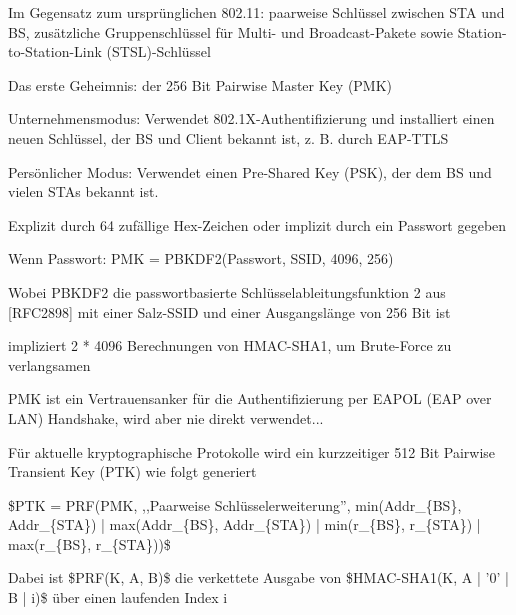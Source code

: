 \documentclass[a4paper]{article}
\begin{document}
\begin{multicols}{3}
      \begin{itemize*}
            \item Im Gegensatz zum ursprünglichen 802.11: paarweise Schlüssel zwischen
            STA und BS, zusätzliche Gruppenschlüssel für Multi- und
            Broadcast-Pakete sowie Station-to-Station-Link (STSL)-Schlüssel
            \item Das erste Geheimnis: der 256 Bit Pairwise Master Key (PMK)
            \begin{itemize*}
                  \item Unternehmensmodus: Verwendet 802.1X-Authentifizierung und installiert einen neuen Schlüssel, der BS und Client bekannt ist, z. B. durch EAP-TTLS
                  \item Persönlicher Modus: Verwendet einen Pre-Shared Key (PSK), der dem BS und vielen STAs bekannt ist.
                  \begin{itemize*} \item Explizit durch 64 zufällige Hex-Zeichen oder implizit durch ein Passwort gegeben \item Wenn Passwort: PMK = PBKDF2(Passwort, SSID, 4096, 256) \item Wobei PBKDF2 die passwortbasierte Schlüsselableitungsfunktion 2 aus {[}RFC2898{]} mit einer Salz-SSID und einer Ausgangslänge von 256 Bit ist \item impliziert 2 * 4096 Berechnungen von HMAC-SHA1, um Brute-Force zu verlangsamen \end{itemize*}
            \end{itemize*}
            \item PMK ist ein Vertrauensanker für die Authentifizierung per EAPOL (EAP
            over LAN) Handshake, wird aber nie direkt verwendet...
            \item Für aktuelle kryptographische Protokolle wird ein kurzzeitiger 512 Bit
            Pairwise Transient Key (PTK) wie folgt generiert
            \begin{itemize*}
                  \item \$PTK = PRF(PMK, ,,Paarweise Schlüsselerweiterung'', min(Addr\_\{BS\}, Addr\_\{STA\}) \textbar| max(Addr\_\{BS\}, Addr\_\{STA\}) \textbar| min(r\_\{BS\}, r\_\{STA\}) \textbar| max(r\_\{BS\}, r\_\{STA\}))\$
                  \item Dabei ist \$PRF(K, A, B)\$ die verkettete Ausgabe von \$HMAC-SHA1(K, A \textbar| '0' \textbar| B \textbar| i)\$ über einen laufenden Index i
            \end{itemize*}

\end{itemize*}
\end{multicols}
\end{document}

